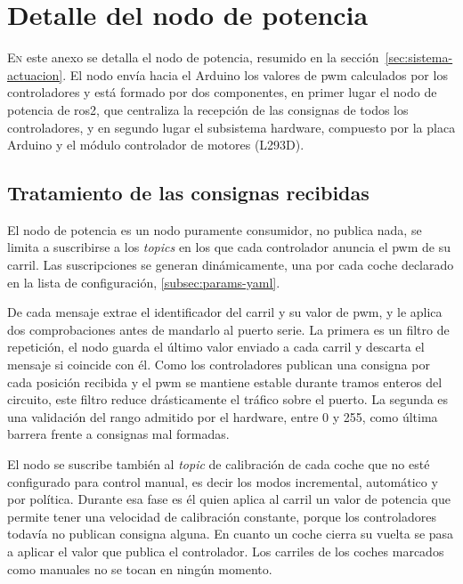 \chapter{Detalle del nodo de potencia}
\label{chap:anexo-actuacion}

\lettrine{E}{n} este anexo se detalla el nodo de potencia, resumido en la sección~\ref{sec:sistema-actuacion}. El nodo envía hacia el Arduino los valores de \gls{pwm} calculados por los controladores y está formado por dos componentes, en primer lugar el nodo de potencia de \gls{ros2}, que centraliza la recepción de las consignas de todos los controladores, y en segundo lugar el subsistema hardware, compuesto por la placa Arduino y el módulo controlador de motores (L293D).

\section{Tratamiento de las consignas recibidas}
\label{subsec:actuacion-topics}

El nodo de potencia es un nodo puramente consumidor, no publica nada, se limita a suscribirse a los \emph{topics} en los que cada controlador anuncia el \gls{pwm} de su carril. Las suscripciones se generan dinámicamente, una por cada coche declarado en la lista de configuración, \ref{subsec:params-yaml}.

De cada mensaje extrae el identificador del carril y su valor de \gls{pwm}, y le aplica dos comprobaciones antes de mandarlo al puerto serie. La primera es un filtro de repetición, el nodo guarda el último valor enviado a cada carril y descarta el mensaje si coincide con él. Como los controladores publican una consigna por cada posición recibida y el \gls{pwm} se mantiene estable durante tramos enteros del circuito, este filtro reduce drásticamente el tráfico sobre el puerto. La segunda es una validación del rango admitido por el hardware, entre 0 y 255, como última barrera frente a consignas mal formadas.

El nodo se suscribe también al \emph{topic} de calibración de cada coche que no esté configurado para control manual, es decir los modos incremental, automático y por política. Durante esa fase es él quien aplica al carril un valor de potencia que permite tener una velocidad de calibración constante, porque los controladores todavía no publican consigna alguna. En cuanto un coche cierra su vuelta se pasa a aplicar el valor que publica el controlador. Los carriles de los coches marcados como manuales no se tocan en ningún momento.

